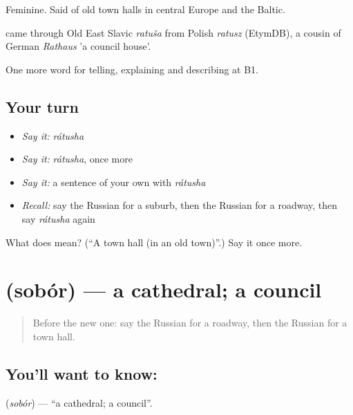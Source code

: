 Feminine. Said of old town halls in central Europe and the Baltic.

\begin{cousinweb}
\emph{} came through Old East Slavic \emph{ratuša} from Polish \emph{ratusz} (EtymDB), a cousin of German \emph{Rathaus} 'a council house'.
\end{cousinweb}

\begin{grammarlens}[title={What you've built}]
One more word for telling, explaining and describing at B1.
\end{grammarlens}

\subsection*{Your turn}
\begin{itemize}
\raggedright
  \item \emph{Say it:} \emph{rátusha}
  \item \emph{Say it:} \emph{rátusha}, once more
  \item \emph{Say it:} a sentence of your own with \emph{rátusha}
  \item \emph{Recall:} say the Russian for a suburb, then the Russian for a roadway, then say \emph{rátusha} again
\end{itemize}

\begin{tcolorbox}[breakable,colback=teal!4,colframe=teal!35!black,title={Before you move on}]
What does  mean? (\textquotedblleft{}A town hall (in an old town)\textquotedblright{}.) Say it once more.
\end{tcolorbox}
\section[\texorpdfstring{\ru{собор} (sobór)}{собор (sobór)}]{ (sobór) — a cathedral; a council}

\label{lesson:RU-C444-sobor}



\begin{quote}
Before the new one: say the Russian for a roadway, then the Russian for a town hall.
\end{quote}

\subsection*{You'll want to know: }
\textbf{} (\emph{sobór}) — \textquotedblleft{}a cathedral; a council\textquotedblright{}.

